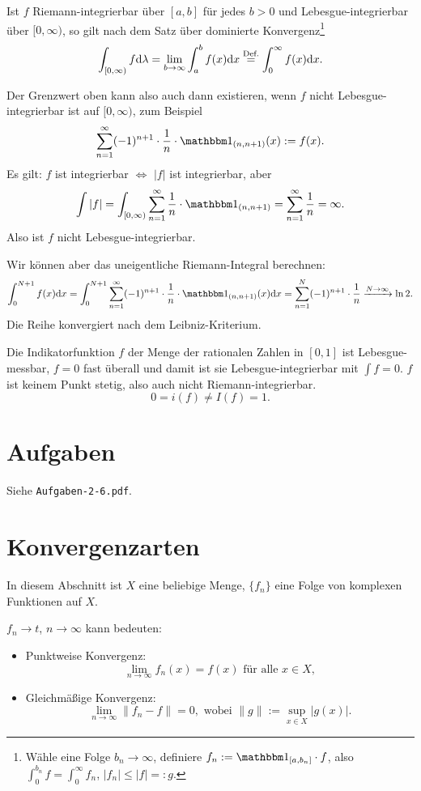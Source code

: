 \begin{prgp}
 Ist $f$ Riemann-integrierbar über $[a,b]$ für jedes $b > 0$ und Lebesgue-integrierbar über $[0,\infty)$, so gilt nach dem Satz über dominierte Konvergenz\footnote{Wähle eine Folge $b_n \to \infty$, definiere $f_n := \ind_{[a,b_n]} \cdot f$, also $\int_0^{b_n} f = \int_0^\infty f_n$, $|f_n| \le |f| =: g$.}
 \[ \int_{[0,\infty)} f \mathrm{d} \lambda = \lim_{b \to \infty} \int_a^b f(x) \mathrm{d} x \overset{\text{Def.}}{=} \int_0^\infty f(x) \mathrm{d} x. \]
\end{prgp}

Der Grenzwert oben kann also auch dann existieren, wenn $f$ nicht Lebesgue-integrierbar ist auf $[0,\infty)$, zum Beispiel
\[ \sum_{n=1}^\infty (-1)^{n+1} \cdot \rez{n} \cdot \ind_{(n,n+1)}(x) := f(x). \]
Es gilt: $f$ ist integrierbar $\Leftrightarrow$ $|f|$ ist integrierbar, aber
\[ \int |f| = \int_{[0,\infty)} \sum_{n=1}^\infty \rez{n} \cdot \ind_{(n,n+1)} = \sum_{n=1}^\infty \rez{n} = \infty. \]
Also ist $f$ nicht Lebesgue-integrierbar. 

Wir können aber das uneigentliche Riemann-Integral berechnen:
\[ \int_0^{N+1} f(x) \diffop x = \int_0^{N+1} \sum_{n=1}^\infty (-1)^{n+1} \cdot \rez{n} \cdot \ind_{(n,n+1)}(x) \diffop x = \sum_{n=1}^N (-1)^{n+1} \cdot \rez{n} \xrightarrow{N \to \infty} \ln 2. \]
Die Reihe konvergiert nach dem Leibniz-Kriterium.

Die Indikatorfunktion $f$ der Menge der rationalen Zahlen in $[0,1]$ ist Lebesgue-messbar, $f=0$ fast überall und damit ist sie Lebesgue-integrierbar mit $\int f = 0$. $f$ ist keinem Punkt stetig, also auch nicht Riemann-integrierbar.
\[ 0 = i(f) \ne I(f) = 1. \]

\section{Aufgaben}
Siehe \verb+Aufgaben-2-6.pdf+.

\section{Konvergenzarten}
In diesem Abschnitt ist $X$ eine beliebige Menge, $\{ f_n \}$ eine Folge von komplexen Funktionen auf $X$.

$f_n \to t$, $n \to \infty$ kann bedeuten:
\begin{itemize}
 \item Punktweise Konvergenz: 
  \[ \lim_{n \to \infty} f_n(x) = f(x) \text{ für alle } x \in X, \]
 \item Gleichmäßige Konvergenz:
  \[ \lim_{n \to \infty} \| f_n - f \| = 0, \text{ wobei } \| g \| := \sup_{x \in X} | g(x) |. \]
\end{itemize}

